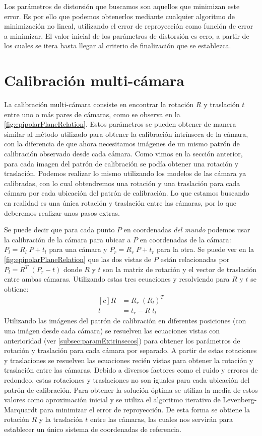 Los parámetros de distorsión que buscamos son aquellos que minimizan este error. Es por ello que podemos obtenerlos mediante cualquier algoritmo de minimización no lineal, utilizando el error de reproyección como función de error a minimizar. El valor inicial de los parámetros de distorsión es cero, a partir de los cuales se itera hasta llegar al criterio de finalización que se establezca.

\section{Calibración multi-cámara}
La calibración multi-cámara consiste en encontrar la rotación $R$ y traslación $t$ entre uno o más pares de cámaras, como se observa en la \autoref{fig:epipolarPlaneRelation}. Estos parámetros se pueden obtener de manera similar al método utilizado para obtener la calibración intrínseca de la cámara, con la diferencia de que ahora necesitamos imágenes de un mismo patrón de calibración observado desde cada cámara. Como vimos en la sección anterior, para cada imagen del patrón de calibración se podía obtener una rotación y traslación. Podemos realizar lo mismo utilizando los modelos de las cámara ya calibradas, con lo cual obtendremos una rotación y una traslación para cada cámara por cada ubicación del patrón de calibración. Lo que estamos buscando en realidad es una única rotación y traslación entre las cámaras, por lo que deberemos realizar unos pasos extras.

Se puede decir que para cada punto $P$ en coordenadas \emph{del mundo} podemos usar la calibración de la cámara para ubicar a $P$ en coordenadas de la cámara: $P_l = R_l \; P + t_l$ para una cámara y $P_r = R_r \; P + t_r$ para la otra. Se puede ver en la \autoref{fig:epipolarPlaneRelation} que las dos vistas de $P$ están relacionadas por $P_l = R^T \; (P_r - t)$ donde $R$ y $t$ son la matriz de rotación y el vector de traslación entre ambas cámaras. Utilizando estas tres ecuaciones y resolviendo para $R$ y $t$ se obtiene:
\begin{equation*}
\begin{aligned}[c]
    R &= R_r \; (R_l)^T
    \\
    t &= t_r - R \; t_l
\end{aligned}
\end{equation*}
Utilizando las imágenes del patrón de calibración en diferentes posiciones (con una imágen desde cada cámara) se resuelven las ecuaciones vistas con anterioridad (ver \autoref{subsec:paramExtrinsecos}) para obtener los parámetros de rotación y traslación para cada cámara por separado. A partir de estas rotaciones y traslaciones se resuelven las ecuaciones recién vistas para obtener la rotación y traslación entre las cámaras. Debido a diversos factores como el ruido y errores de redondeo, estas rotaciones y traslaciones no son iguales para cada ubicación del patrón de calibración. Para obtener la solución óptima se utiliza la media de estos valores como aproximación inicial y se utiliza el algoritmo iterativo de Levenberg-Marquardt para minimizar el error de reproyección. De esta forma se obtiene la rotación $R$ y la traslación $t$ entre las cámaras, las cuales nos servirán para establecer un único sistema de coordenadas de referencia.

